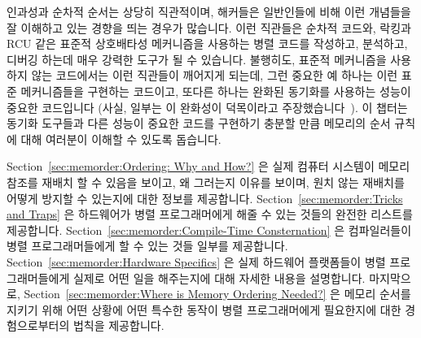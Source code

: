 
%

인과성과 순차적 순서는 상당히 직관적이며, 해커들은 일반인들에 비해 이런
개념들을 잘 이해하고 있는 경향을 띄는 경우가 많습니다.
이런 직관들은 순차적 코드와, 락킹과 RCU 같은 표준적 상호배타성 메커니즘을
사용하는 병렬 코드를 작성하고, 분석하고, 디버깅 하는데 매우 강력한 도구가 될 수
있습니다.
불행히도, 표준적 메커니즘을 사용하지 않는 코드에서는 이런 직관들이 깨어지게
되는데, 그런 중요한 예 하나는 이런 표준 메커니즘들을 구현하는 코드이고, 또다른
하나는 완화된 동기화를 사용하는 성능이 중요한 코드입니다 (사실, 일부는 이
완화성이 덕목이라고 주장했습니다~\cite{JadeAlglave2013-WeaknessIsVirtue}).
이 챕터는 동기화 도구들과 다른 성능이 중요한 코드를 구현하기 충분할 만큼
메모리의 순서 규칙에 대해 여러분이 이해할 수 있도록 돕습니다.

Section~\ref{sec:memorder:Ordering: Why and How?}
은 실제 컴퓨터 시스템이 메모리 참조를 재배치 할 수 있음을 보이고, 왜 그러는지
이유를 보이며, 원치 않는 재배치를 어떻게 방지할 수 있는지에 대한 정보를
제공합니다.
Section~\ref{sec:memorder:Tricks and Traps}
은 하드웨어가 병렬 프로그래머에게 해줄 수 있는 것들의 완전한 리스트를
제공합니다.
Section~\ref{sec:memorder:Compile-Time Consternation}
은 컴파일러들이 병렬 프로그래머들에게 할 수 있는 것들 일부를 제공합니다.
Section~\ref{sec:memorder:Hardware Specifics}
은 실제 하드웨어 플랫폼들이 병렬 프로그래머들에게 실제로 어떤 일을 해주는지에
대해 자세한 내용을 설명합니다.
마지막으로, Section~\ref{sec:memorder:Where is Memory Ordering Needed?}
은 메모리 순서를 지키기 위해 어떤 상황에 어떤 특수한 동작이 병렬 프로그래머에게
필요한지에 대한 경험으로부터의 법칙을 제공합니다.
\iffalse

